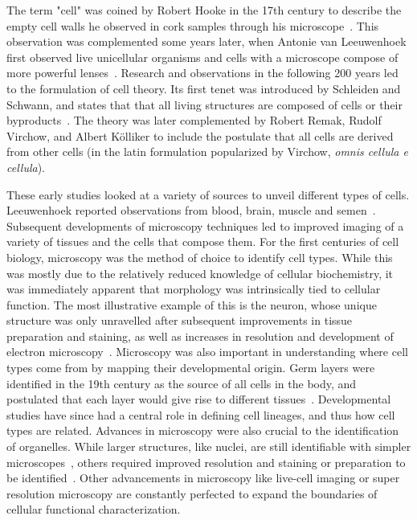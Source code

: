The term "cell" was coined by Robert Hooke in the 17th century to describe the empty cell walls he observed in cork samples through his microscope~\citep{hooke_micrographia:_1667}. This observation was complemented some years later, when Antonie van Leeuwenhoek first observed live unicellular organisms and cells with a microscope compose of more powerful lenses~\citep{mazzarello_unifying_1999}. Research and observations in the following 200 years led to the formulation of cell theory. Its first tenet was introduced by Schleiden and Schwann, and states that that all living structures are composed of cells or their byproducts~\citep{schwann_microscopical_1847}. The theory was later complemented by Robert Remak, Rudolf Virchow, and Albert Kölliker to include the postulate that all cells are derived from other cells (in the latin formulation popularized by Virchow, \textit{omnis cellula e cellula}).

These early studies looked at a variety of sources to unveil different types of cells. Leeuwenhoek reported observations from blood, brain, muscle and semen~\citep{leeuwenhoeck_m_microscopical_1674,leeuwenhoek_antoni_van_observationes_1677}. Subsequent developments of microscopy techniques led to improved imaging of a variety of tissues and the cells that compose them. For the first centuries of cell biology, microscopy was the method of choice to identify cell types. While this was mostly due to the relatively reduced knowledge of cellular biochemistry, it was immediately apparent that morphology was intrinsically tied to cellular function. The most illustrative example of this is the neuron, whose unique structure was only unravelled after subsequent improvements in tissue preparation and staining, as well as increases in resolution and development of electron microscopy~\citep{mazzarello_unifying_1999}. Microscopy was also important in understanding where cell types come from by mapping their developmental origin. Germ layers were identified in the 19th century as the source of all cells in the body, and postulated that each layer would give rise to different tissues~\citep{collins_terminology_1995}. Developmental studies have since had a central role in defining cell lineages, and thus how cell types are related. Advances in microscopy were also crucial to the identification of organelles. While larger structures, like nuclei, are still identifiable with simpler microscopes~\citep{brown_organs_1866}, others required improved resolution and staining or preparation to be identified~\citep{golgi_structure_1989}. Other advancements in microscopy like live-cell imaging or super resolution microscopy are constantly perfected to expand the boundaries of cellular functional characterization.

